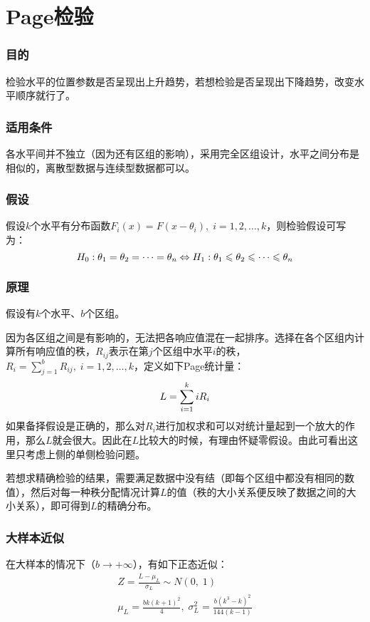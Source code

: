 \section{Page检验}

\subsubsection{目的}
检验水平的位置参数是否呈现出上升趋势，若想检验是否呈现出下降趋势，改变水平顺序就行了。
\subsubsection{适用条件}
各水平间并不独立（因为还有区组的影响），采用完全区组设计，水平之间分布是相似的，离散型数据与连续型数据都可以。
\subsubsection{假设}
假设$k$个水平有分布函数$F_i(x)=F(x-\theta_i),\;i=1,2,\dots,k$，则检验假设可写为：
\begin{equation}
	H_0:\theta_1=\theta_2=\cdots=\theta_n\Leftrightarrow
	H_1:\theta_1\leqslant\theta_2\leqslant\cdots\leqslant\theta_n\notag
\end{equation}
\subsubsection{原理}
假设有$k$个水平、$b$个区组。\par
因为各区组之间是有影响的，无法把各响应值混在一起排序。选择在各个区组内计算所有响应值的秩，$R_{ij}$表示在第$j$个区组中水平$i$的秩，$R_i=\sum\limits_{j=1}^bR_{ij},\;i=1,2,\dots,k$，定义如下Page统计量：
\begin{equation}
	L=\sum_{i=1}^kiR_i\notag
\end{equation}
如果备择假设是正确的，那么对$R_i$进行加权求和可以对统计量起到一个放大的作用，那么$L$就会很大。因此在$L$比较大的时候，有理由怀疑零假设。由此可看出这里只考虑上侧的单侧检验问题。\par
若想求精确检验的结果，需要满足数据中没有结（即每个区组中都没有相同的数值），然后对每一种秩分配情况计算$L$的值（秩的大小关系便反映了数据之间的大小关系），即可得到$L$的精确分布。
\subsubsection{大样本近似}
在大样本的情况下（$b\to+\infty$），有如下正态近似：
\begin{gather*}
	Z=\frac{L-\mu_L}{\sigma_L}\sim N(0,\;1) \\
	\mu_L=\frac{bk(k+1)^2}{4},\;\sigma_L^2=\frac{b(k^3-k)^2}{144(k-1)}
\end{gather*}
